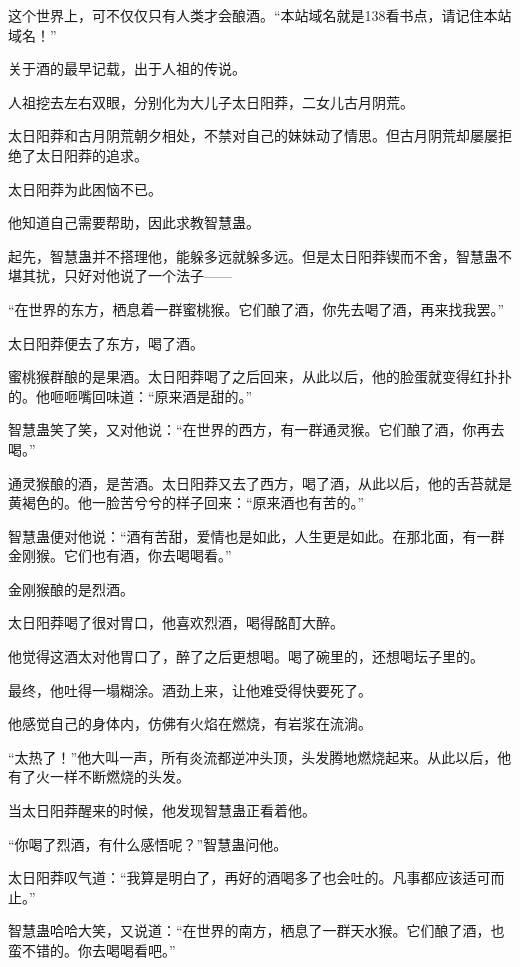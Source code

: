 
\begin{this_body}

这个世界上，可不仅仅只有人类才会酿酒。“本站域名就是138看书点，请记住本站域名！”

关于酒的最早记载，出于人祖的传说。

人祖挖去左右双眼，分别化为大儿子太日阳莽，二女儿古月阴荒。

太日阳莽和古月阴荒朝夕相处，不禁对自己的妹妹动了情思。但古月阴荒却屡屡拒绝了太日阳莽的追求。

太日阳莽为此困恼不已。

他知道自己需要帮助，因此求教智慧蛊。

起先，智慧蛊并不搭理他，能躲多远就躲多远。但是太日阳莽锲而不舍，智慧蛊不堪其扰，只好对他说了一个法子——

“在世界的东方，栖息着一群蜜桃猴。它们酿了酒，你先去喝了酒，再来找我罢。”

太日阳莽便去了东方，喝了酒。

蜜桃猴群酿的是果酒。太日阳莽喝了之后回来，从此以后，他的脸蛋就变得红扑扑的。他咂咂嘴回味道：“原来酒是甜的。”

智慧蛊笑了笑，又对他说：“在世界的西方，有一群通灵猴。它们酿了酒，你再去喝。”

通灵猴酿的酒，是苦酒。太日阳莽又去了西方，喝了酒，从此以后，他的舌苔就是黄褐色的。他一脸苦兮兮的样子回来：“原来酒也有苦的。”

智慧蛊便对他说：“酒有苦甜，爱情也是如此，人生更是如此。在那北面，有一群金刚猴。它们也有酒，你去喝喝看。”

金刚猴酿的是烈酒。

太日阳莽喝了很对胃口，他喜欢烈酒，喝得酩酊大醉。

他觉得这酒太对他胃口了，醉了之后更想喝。喝了碗里的，还想喝坛子里的。

最终，他吐得一塌糊涂。酒劲上来，让他难受得快要死了。

他感觉自己的身体内，仿佛有火焰在燃烧，有岩浆在流淌。

“太热了！”他大叫一声，所有炎流都逆冲头顶，头发腾地燃烧起来。从此以后，他有了火一样不断燃烧的头发。

当太日阳莽醒来的时候，他发现智慧蛊正看着他。

“你喝了烈酒，有什么感悟呢？”智慧蛊问他。

太日阳莽叹气道：“我算是明白了，再好的酒喝多了也会吐的。凡事都应该适可而止。”

智慧蛊哈哈大笑，又说道：“在世界的南方，栖息了一群天水猴。它们酿了酒，也蛮不错的。你去喝喝看吧。”


\end{this_body}

